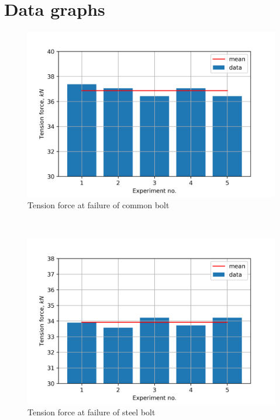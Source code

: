 \section{Data graphs}
\begin{figure}[ht]
	\centering
	\includegraphics[width=150mm]{Exp2cb.png}
	\caption{Tension force at failure of common bolt}
\end{figure}$ $
\begin{figure}[ht]
	\centering
	\includegraphics[width=150mm]{Exp2sb.png}
	\caption{Tension force at failure of steel bolt}
\end{figure}